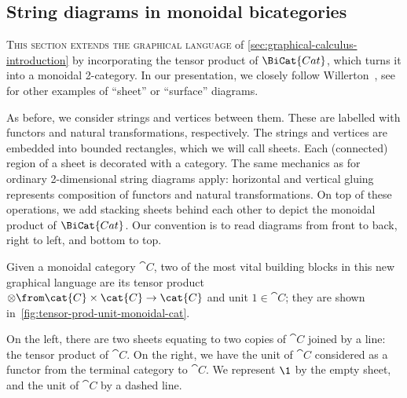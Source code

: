 \subsection{String diagrams in monoidal bicategories}\label{sec:string-diagr-mono}

\textsc{This section extends the graphical language} of
\cref{sec:graphical-calculus-introduction}
by incorporating the tensor product of \(\BiCat{Cat}\),
which turns it into a monoidal 2-category.
In our presentation, we closely follow Willerton~\cite{Willerton2008},
see~\cite{day03:lax,street03:funct,barrett24:gray,demirdilek25:surfac-diagr-froben-algeb-froben}
for other examples of ``sheet'' or ``surface'' diagrams.

As before, we consider strings and vertices between them.
These are labelled with functors and natural transformations, respectively.
The strings and vertices are embedded into bounded rectangles, which we will call sheets.
Each (connected) region of a sheet is decorated with a category.
The same mechanics as for ordinary 2-dimensional string diagrams apply:
horizontal and vertical gluing represents composition of functors and natural transformations.
On top of these operations,
we add stacking sheets behind each other to depict the monoidal product of \(\BiCat{Cat}\).
Our convention is to read diagrams from front to back,
right to left, and bottom to top.

Given a monoidal category \(\cat{C}\),
two of the most vital building blocks in this new graphical language are
its tensor product \(\otimes\from \cat{C} \times \cat{C} \to \cat{C}\) and unit \(1 \in \cat{C}\);
they are shown in~\cref{fig:tensor-prod-unit-monoidal-cat}.
\begin{figure}[htbp]
  \centering
\end{figure}
On the left, there are two sheets equating to two copies of \(\cat{C}\)
joined by a line: the tensor product of \(\cat{C}\).
On the right,
we have the unit of \(\cat{C}\)
considered as a functor
from the terminal category to \(\cat{C}\).
We represent \(\1\) by the empty sheet,
and the unit of \(\cat{C}\) by a dashed line.

